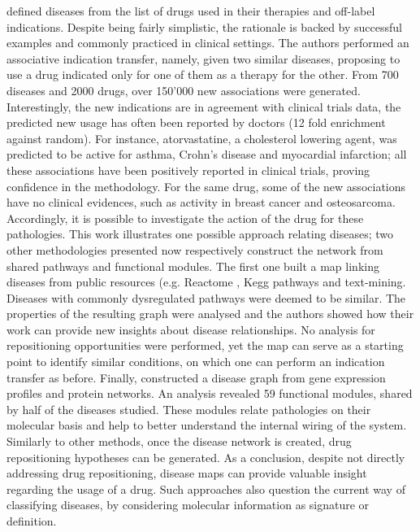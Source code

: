 \cite{chiang2009systematic} defined diseases from the list of drugs used in their therapies and off-label indications. Despite being fairly simplistic, the rationale is backed by successful examples and commonly practiced in clinical settings. The authors performed an associative indication transfer, namely, given two similar diseases, proposing to use a drug indicated only for one of them as a therapy for the other. From 700 diseases and 2000 drugs, over 150’000 new associations were generated. Interestingly, the new indications are in agreement with clinical trials data, the predicted new usage has often been reported by doctors (12 fold enrichment against random). For instance, atorvastatine, a cholesterol lowering agent, was predicted to be active for asthma, Crohn's disease and myocardial infarction; all these associations have been positively reported in clinical trials, proving confidence in the methodology. For the same drug, some of the new associations have no clinical evidences, such as activity in breast cancer and osteosarcoma. Accordingly, it is possible to investigate the action of the drug for these pathologies. This work illustrates one possible approach relating diseases; two other methodologies presented now respectively construct the network from shared pathways and functional modules.
The first one \citep{li2009pathway} built a map linking diseases from public resources (e.g. Reactome \citep{matthews2009reactome}, Kegg pathways \citep{goto1996organizing} and text-mining. Diseases with commonly dysregulated pathways were deemed to be similar. The properties of the resulting graph were analysed and the authors showed how their work can provide new insights about disease relationships. No analysis for repositioning opportunities were performed, yet the map can serve as a starting point to identify similar conditions, on which one can perform an indication transfer as before.
Finally, \cite{suthram2010network} constructed a disease graph from gene expression profiles and protein networks. An analysis revealed 59 functional modules, shared by half of the diseases studied. These modules relate pathologies on their molecular basis and help to better understand the internal wiring of the system. Similarly to other methods, once the disease network is created, drug repositioning hypotheses can be generated.
As a conclusion, despite not directly addressing drug repositioning, disease maps can provide valuable insight regarding the usage of a drug. Such approaches also question the current way of classifying diseases, by considering molecular information as signature or definition.

